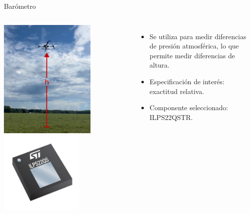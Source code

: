 \begin{frame}{Barómetro}
	\begin{columns}
			\includegraphics[width=0.7\textwidth]{img/drone_altitude.png}
			\includegraphics[width=0.6\textwidth]{img/ILSP22QSTR.png}
			\begin{itemize}
				\item Se utiliza para medir diferencias de presión atmosférica, lo que permite medir diferencias de altura.
				\item Especificación de interés: exactitud relativa.
				\item Componente seleccionado: ILPS22QSTR.
			\end{itemize}
	\end{columns}
\end{frame}

